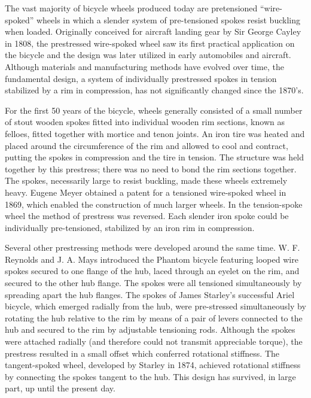 \documentclass[../thesis.tex]{subfiles}
\begin{document}
The vast majority of bicycle wheels produced today are pretensioned ``wire-spoked'' wheels in which a slender system of pre-tensioned spokes resist buckling when loaded. Originally conceived for aircraft landing gear by Sir George Cayley in 1808, the prestressed wire-spoked wheel saw its first practical application on the bicycle and the design was later utilized in early automobiles and aircraft\cite{HadlandLessing}. Although materials and manufacturing methods have evolved over time, the fundamental design, a system of individually prestressed spokes in tension stabilized by a rim in compression, has not significantly changed since the 1870's.

For the first 50 years of the bicycle, wheels generally consisted of a small number of stout wooden spokes fitted into individual wooden rim sections, known as felloes, fitted together with mortice and tenon joints. An iron tire was heated and placed around the circumference of the rim and allowed to cool and contract, putting the spokes in compression and the tire in tension\cite{Sharp}. The structure was held together by this prestress; there was no need to bond the rim sections together. The spokes, necessarily large to resist buckling, made these wheels extremely heavy. Eugene Meyer obtained a patent for a tensioned wire-spoked wheel in 1869, which enabled the construction of much larger wheels\cite{Clayton}. In the tension-spoke wheel the method of prestress was reversed. Each slender iron spoke could be individually pre-tensioned, stabilized by an iron rim in compression.

Several other prestressing methods were developed around the same time. W. F. Reynolds and J. A. Mays introduced the Phantom bicycle featuring looped wire spokes secured to one flange of the hub, laced through an eyelet on the rim, and secured to the other hub flange\cite{Herlihy}. The spokes were all tensioned simultaneously by spreading apart the hub flanges. The spokes of James Starley's successful Ariel bicycle, which emerged radially from the hub, were pre-stressed simultaneously by rotating the hub relative to the rim by means of a pair of levers connected to the hub and secured to the rim by adjustable tensioning rods\cite{Caunter}. Although the spokes were attached radially (and therefore could not transmit appreciable torque), the prestress resulted in a small offset which conferred rotational stiffness. The tangent-spoked wheel, developed by Starley in 1874, achieved rotational stiffness by connecting the spokes tangent to the hub. This design has survived, in large part, up until the present day.
\end{document}

